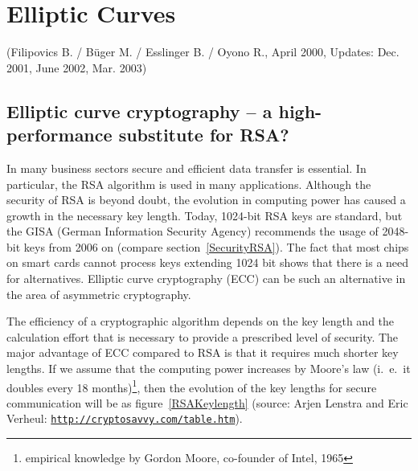 
\newpage
\hypertarget{ellcurve}{}
\chapter{Elliptic Curves}
\label{Chapter_EllipticCurves}
(Filipovics B. / B\"uger M. / Esslinger B. / Oyono R., April 2000, Updates: Dec. 2001, June 2002, Mar. 2003)

\section{Elliptic curve cryptography -- a high-performance substitute for RSA?}
\label{ECAlternative}


In many business sectors secure and efficient data transfer is essential.
In particular, the RSA algorithm is used in many applications. Although the
security of RSA is beyond doubt, the evolution in computing power has
caused a growth in the necessary key length.  Today, 1024-bit RSA keys are
standard, but the GISA (German Information Security Agency)
recommends the usage of 2048-bit keys from 2006 on (compare
section~\ref{SecurityRSA}).  The fact that most chips on smart cards cannot
process keys extending 1024 bit shows that there is a need for
alternatives. Elliptic curve cryptography (ECC) can be such an
alternative in the area of asymmetric cryptography.

The efficiency of a cryptographic algorithm depends on the key length and
the calculation effort that is necessary to provide a prescribed level of
security. The major advantage of ECC compared to RSA is that it requires
much shorter key lengths. If we assume that the computing power increases
by Moore's law (i.~e.\ it doubles every 18 months)\footnote{empirical
knowledge by Gordon Moore, co-founder of Intel, 1965}, then the evolution of
the key lengths for secure communication will be as figure~\ref{RSAKeylength}
\cite{Lenstra1999} (source: Arjen Lenstra and Eric Verheul:
\href{http://cryptosavvy.com/table.htm}
{\texttt{http://cryptosavvy.com/table.htm}}).

